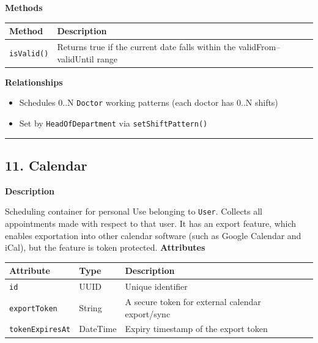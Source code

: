 \documentclass[12pt, a4paper]{article}
\begin{document}
\textbf{Methods}

\begin{center}
\small
\renewcommand{\arraystretch}{1.35}
\begin{tabularx}{\textwidth}{|M|Y|}
\hline
{}
\textbf{Method} & \textbf{Description} \\ \hline
\texttt{isValid()} & Returns true if the current date falls within the validFrom–validUntil range \\ \hline
\end{tabularx}
\end{center}

\textbf{Relationships}

\begin{itemize}
    \item Schedules 0..N \texttt{Doctor} working patterns (each doctor has 0..N shifts)
    \item Set by \texttt{HeadOfDepartment} via \texttt{setShiftPattern()}
\end{itemize}

\par\medskip\hrule\medskip

\subsection{11. Calendar}\label{sec:11-calendar}

\textbf{Description}

Scheduling container for personal Use belonging to \texttt{User}. Collects all appointments made with respect to that user. It has an export feature, which enables exportation into other calendar software (such as Google Calendar and iCal), but the feature is token protected.
\textbf{Attributes}

\begin{center}
\small
\renewcommand{\arraystretch}{1.35}
\begin{tabularx}{\textwidth}{|>{\raggedright\arraybackslash}p{3.4cm}|>{\raggedright\arraybackslash}p{3.3cm}|Y|}
\hline
{}
\textbf{Attribute} & \textbf{Type} & \textbf{Description} \\ \hline
\texttt{id} & UUID & Unique identifier \\ \hline
\texttt{exportToken} & String & A secure token for external calendar export/sync \\ \hline
\texttt{tokenExpiresAt} & DateTime & Expiry timestamp of the export token \\ \hline
\end{tabularx}
\end{center}
\end{document}
